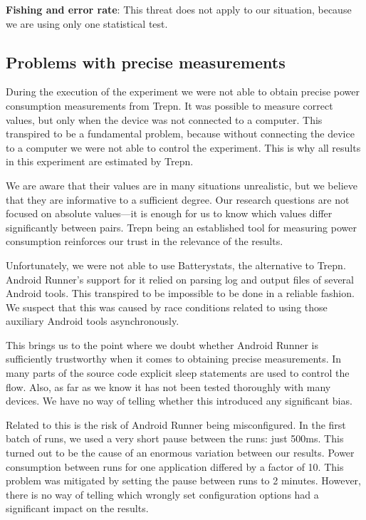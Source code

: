 \textbf{Fishing and error rate}: This threat does not apply to our situation, because we are using only one statistical test.

\subsection{Problems with precise measurements}\label{sub:softwareproblems}
During the execution of the experiment we were not able to obtain precise power consumption measurements from Trepn. It was possible to measure correct values, but only when the device was not connected to a computer. This transpired to be a fundamental problem, because without connecting the device to a computer we were not able to control the experiment. This is why all results in this experiment are estimated by Trepn.

We are aware that their values are in many situations unrealistic, but we believe that they are informative to a sufficient degree. Our research questions are not focused on absolute values---it is enough for us to know which values differ significantly between pairs. Trepn being an established tool for measuring power consumption reinforces our trust in the relevance of the results.

Unfortunately, we were not able to use Batterystats, the alternative to Trepn. Android Runner's support for it relied on parsing log and output files of several Android tools. This transpired to be impossible to be done in a reliable fashion. We suspect that this was caused by race conditions related to using those auxiliary Android tools asynchronously. 

This brings us to the point where we doubt whether Android Runner is sufficiently trustworthy when it comes to obtaining precise measurements. In many parts of the source code explicit sleep statements are used to control the flow. Also, as far as we know it has not been tested thoroughly with many devices. We have no way of telling whether this introduced any significant bias.

Related to this is the risk of Android Runner being misconfigured. In the first batch of runs, we used a very short pause between the runs: just 500ms. This turned out to be the cause of an enormous variation between our results. Power consumption between runs for one application differed by a factor of 10. This problem was mitigated by setting the pause between runs to 2 minutes. However, there is no way of telling which wrongly set configuration options had a significant impact on the results.


